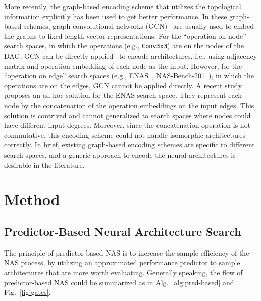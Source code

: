 \documentclass[runningheads]{llncs}
\begin{document}
More recently, the graph-based encoding scheme that utilizes the topological information explicitly has been used to get better performance. In these graph-based schemes,
graph convolutional networks (GCN)~\cite{kipf2016semi} are usually used to embed the graphs to fixed-length vector representations. For the ``operation on node'' search spaces, in which the operations (e.g., \texttt{Conv3x3}) are on the nodes of the DAG,
GCN can be directly applied~\cite{shi2019multi} to encode architectures, i.e., using adjacency matrix and operation embedding of each node as the input. 
However, for the ``operation on edge'' search spaces (e.g., ENAS~\cite{pham2018efficient}, NAS-Bench-201~\cite{Dong2020NAS-Bench-201}), in which the operations are on the edges, GCN cannot be applied directly.
A recent study~\cite{guo2019nat} proposes an ad-hoc solution for the ENAS search space. They represent each node by the concatenation of the operation embeddings on the input edges. This solution is contrived and cannot generalized to search spaces where nodes could have different input degrees. Moreover, since the concatenation operation is not commutative, this encoding scheme could not handle isomorphic architectures correctly.
In brief, existing graph-based encoding schemes are specific to different search spaces, 
and a generic approach to encode the neural architectures is desirable in the literature.




\section{Method}
\label{sec:napp}


\subsection{Predictor-Based Neural Architecture Search}
\label{sec:pb-nas}

The principle of predictor-based NAS is to increase the sample efficiency of the NAS process, by utilizing an approximated performance predictor to sample architectures that are more worth evaluating.
Generally speaking, the flow of predictor-based NAS could be summarized as in Alg.~\ref{alg:pred-based} and Fig.~\ref{fig:gates}.
\end{document}
